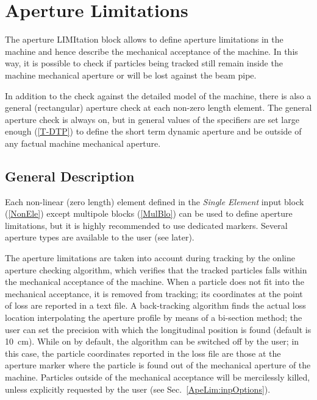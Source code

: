 \section{Aperture Limitations} \label{ApeLim}
The aperture LIMItation block allows to define aperture limitations in the machine and hence describe the mechanical acceptance of the machine.
In this way, it is possible to check if particles being tracked still remain inside the machine mechanical aperture or will be lost against the beam pipe.

In addition to the check against the detailed model of the machine, there is also a general (rectangular) aperture check at each non-zero length element.
The general aperture check is always on, but in general values of the specifiers are set large enough (\ref{T-DTP}) to define the short term dynamic aperture and be outside of any factual machine mechanical aperture.

\subsection{General Description} \label{ApeLim:GenDesc}
Each non-linear (zero length) element defined in the \textit{Single Element} input block (\ref{NonEle}) except multipole blocks (\ref{MulBlo}) can be used to define aperture limitations, but it is highly recommended to use dedicated markers.
Several aperture types are available to the user (see later).

The aperture limitations are taken into account during tracking by the online aperture checking algorithm, which verifies that the tracked particles falls within the mechanical acceptance of the machine.
When a particle does not fit into the mechanical acceptance, it is removed from tracking; its coordinates at the point of loss are reported in a text file.
A back-tracking algorithm finds the actual loss location interpolating the aperture profile by means of a bi-section method; the user can set the precision with which the longitudinal position is found (default is 10~cm).
While on by default, the algorithm can be switched off by the user; in this case, the particle coordinates reported in the loss file are those at the aperture marker where the particle is found out of the mechanical aperture of the machine.
Particles outside of the mechanical acceptance will be mercilessly killed, unless explicitly requested by the user (see Sec.~\ref{ApeLim:inpOptions}).

